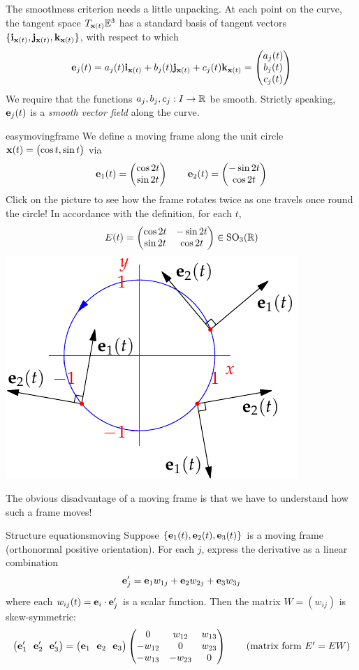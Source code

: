 The smoothness criterion needs a little unpacking. At each point on the curve, the tangent space $T_{{\mathbf{x}}(t)}\mathbb{E}^3$ has a standard basis of tangent vectors $\{{\mathbf{i}}_{{\mathbf{x}}(t)},{\mathbf{j}}_{{\mathbf{x}}(t)},{\mathbf{k}}_{{\mathbf{x}}(t)}\}$, with respect to which
\[
	{\mathbf{e}}_j(t) =a_j(t){\mathbf{i}}_{{\mathbf{x}}(t)}+b_j(t){\mathbf{j}}_{{\mathbf{x}}(t)}+c_j(t){\mathbf{k}}_{{\mathbf{x}}(t)} =\begin{pmatrix}a_j(t)\\b_j(t)\\c_j(t)\end{pmatrix}
\]
We require that the functions $a_j,b_j,c_j:I\to \mathbb{R}$ be smooth. Strictly speaking, ${\mathbf{e}}_j(t)$ is a \emph{smooth vector field} along the curve.


\begin{example}[lower separated=false, sidebyside, sidebyside align=top seam, sidebyside gap=0pt, righthand width=0.4\linewidth]{}{easymovingframe}
	We define a moving frame along the unit circle ${\mathbf{x}}(t)=\bigl(\cos t,\sin t\bigr)$ via
	\[
		{\mathbf{e}}_1(t) =\begin{pmatrix}\cos 2t\\\sin 2t\end{pmatrix}\qquad {\mathbf{e}}_2(t) =\begin{pmatrix}-\sin 2t\\\cos 2t\end{pmatrix}
	\]
	Click on the picture to see how the frame rotates twice as one travels once round the circle!\smallbreak
	In accordance with the definition, for each $t$,
	\[
		E(t)=
		\begin{pmatrix}
			\cos 2t&-\sin 2t\\
			\sin 2t&\cos 2t
		\end{pmatrix}
		\in\mathrm{SO}_3(\mathbb{R})
	\]
	\tcblower
	\flushright\href{http://math.uci.edu/~ndonalds/math162a/vector-anim.html}{\includegraphics[scale=0.9]{vector-anim2}}
\end{example}

\goodbreak


The obvious disadvantage of a moving frame is that we have to understand how such a frame moves!

\begin{thm}{Structure equations}{moving}
	Suppose $\{{\mathbf{e}}_1(t),{\mathbf{e}}_2(t),{\mathbf{e}}_3(t)\}$ is a moving frame (orthonormal positive orientation). For each $j$, express the derivative as a linear combination
	\[
		{\mathbf{e}}_j'={\mathbf{e}}_1w_{1j}+{\mathbf{e}}_2w_{2j}+{\mathbf{e}}_3w_{3j}
	\]
	where each $w_{ij}(t) ={\mathbf{e}}_i\cdot{\mathbf{e}}_j'$ is a scalar function. Then the matrix $W=(w_{ij})$ is skew-symmetric:\footnotemark
	\[
		\bigl(\ve_1'\ \ \ve_2'\ \ \ve_3'\bigr)=
		\bigl(\ve_1\ \ \ve_2\ \ \ve_3\bigr)
		\begin{pmatrix}
			0&w_{12}&w_{13}\\
			-w_{12}&0&w_{23}\\
			-w_{13}&-w_{23}&0
		\end{pmatrix}
		\tag{matrix form $E'=EW$}
	\]
\end{thm}

